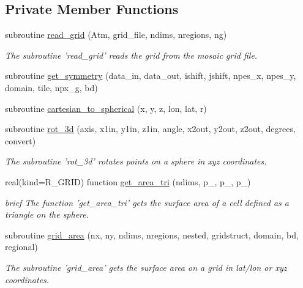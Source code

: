\subsection*{Private Member Functions}
\begin{DoxyCompactItemize}
\item 
subroutine \hyperlink{classfv__grid__tools__mod_a0cd79c60df097353dc6306eafbf5c4b5}{read\-\_\-grid} (Atm, grid\-\_\-file, ndims, nregions, ng)
\begin{DoxyCompactList}\small\item\em The subroutine 'read\-\_\-grid' reads the grid from the mosaic grid file. \end{DoxyCompactList}\item 
subroutine \hyperlink{classfv__grid__tools__mod_a53b69d107e7bd2468e963e91ac7af946}{get\-\_\-symmetry} (data\-\_\-in, data\-\_\-out, ishift, jshift, npes\-\_\-x, npes\-\_\-y, domain, tile, npx\-\_\-g, bd)
\item 
subroutine \hyperlink{classfv__grid__tools__mod_ac67120f726ca8489dbe875f87c29543f}{cartesian\-\_\-to\-\_\-spherical} (x, y, z, lon, lat, r)
\item 
subroutine \hyperlink{classfv__grid__tools__mod_adbf51ca68c05a220a30c0872b301607e}{rot\-\_\-3d} (axis, x1in, y1in, z1in, angle, x2out, y2out, z2out, degrees, convert)
\begin{DoxyCompactList}\small\item\em The subroutine 'rot\-\_\-3d' rotates points on a sphere in xyz coordinates. \end{DoxyCompactList}\item 
real(kind=R\-\_\-\-G\-R\-I\-D) function \hyperlink{classfv__grid__tools__mod_a6acc2cdd48faa66fba3722b877ab8bb8}{get\-\_\-area\-\_\-tri} (ndims, p\-\_, p\-\_, p\-\_)
\begin{DoxyCompactList}\small\item\em brief The function 'get\-\_\-area\-\_\-tri' gets the surface area of a cell defined as a triangle on the sphere. \end{DoxyCompactList}\item 
subroutine \hyperlink{classfv__grid__tools__mod_afc50b41fc30c3e0f7990440cc6a8b896}{grid\-\_\-area} (nx, ny, ndims, nregions, nested, gridstruct, domain, bd, regional)
\begin{DoxyCompactList}\small\item\em The subroutine 'grid\-\_\-area' gets the surface area on a grid in lat/lon or xyz coordinates. \end{DoxyCompactList}\item 

\end{DoxyCompactItemize}
